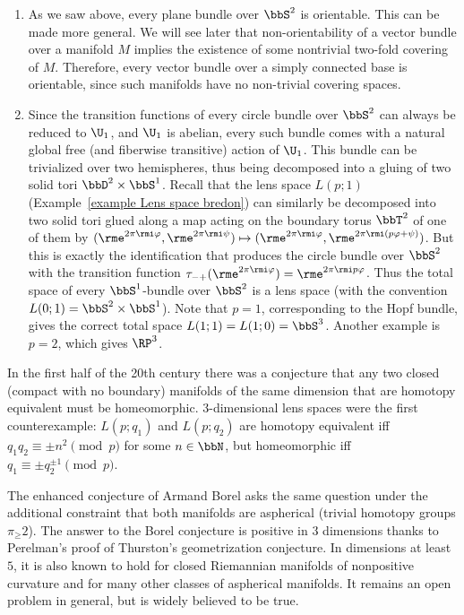 \begin{example}\label{ex circle bundles over S2}
     \begin{enumerate}
        \item As we saw above, every plane bundle over $\bbS^2$ is orientable. This can be made more general. We will see later that non-orientability of a vector bundle over a manifold $M$ implies the existence of some nontrivial two-fold covering of $M$. Therefore, every vector bundle over a simply connected base is orientable, since such manifolds have no non-trivial covering spaces.
        
        \item Since the transition functions of every circle bundle over $\bbS^2$ can always be reduced to $\U_1$, and $\U_1$ is abelian, every such bundle comes with a natural global free (and fiberwise transitive) action of $\U_1$. This bundle can be trivialized over two hemispheres, thus being decomposed into a gluing of two solid tori $\bbD^2\times \bbS^1$. Recall that the lens space $L(p;1)$ (Example~\ref{example Lens space bredon}) can similarly be decomposed into two solid tori glued along a map acting on the boundary torus $\bbT^2$ of one of them by $(\rme^{2\pi\rmi \varphi},\rme^{2\pi\rmi\psi})\mapsto (\rme^{2\pi\rmi\varphi},\rme^{2\pi\rmi(p\varphi+\psi)})$. But this is exactly the identification that produces the circle bundle over $\bbS^2$ with the transition function $\tau_{-+}(\rme^{2\pi\rmi\varphi})=\rme^{2\pi\rmi p\varphi}$. Thus the total space of every $\bbS^1$-bundle over $\bbS^2$ is a lens space (with the convention $L(0;1)=\bbS^2\times\bbS^1$). Note that $p=1$, corresponding to the Hopf bundle, gives the correct total space $L(1;1)=L(1;0)=\bbS^3$. Another example is $p=2$, which gives $\RP^3$. 
    \end{enumerate}
\end{example}
   
\begin{rem}
    In the first half of the 20th century there was a conjecture that any two closed (compact with no boundary) manifolds of the same dimension that are homotopy equivalent must be homeomorphic. 3-dimensional lens spaces were the first counterexample: $L(p;q_1)$ and $L(p;q_2)$ are homotopy equivalent iff $q_1q_2\equiv \pm n^2\pmod{p}$ for some $n\in\bbN$, but homeomorphic iff $q_1\equiv \pm q_2^{\pm 1}\pmod{p}$.

    The enhanced conjecture of Armand Borel asks the same question under the additional constraint that both manifolds are aspherical (trivial homotopy groups $\pi_\geq 2$). The answer to the Borel conjecture is positive in 3 dimensions thanks to Perelman's proof of Thurston's geometrization conjecture. In dimensions at least $5$, it is also known to hold for closed Riemannian manifolds of nonpositive curvature and for many other classes of aspherical manifolds. It remains an open problem in general, but is widely believed to be true.
\end{rem}


